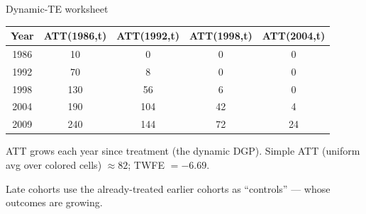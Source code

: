 \documentclass[aspectratio=169,11pt]{beamer}
\begin{document}
\begin{frame}{Dynamic-TE worksheet}
\begin{center}\footnotesize
\begin{tabular}{c|cccc}
\toprule
\textbf{Year} & \textbf{ATT(1986,t)} & \textbf{ATT(1992,t)} & \textbf{ATT(1998,t)} & \textbf{ATT(2004,t)} \\
\midrule
1986 & \cellcolor{forest!18}10 & 0 & 0 & 0 \\
1992 & \cellcolor{forest!18}70 & \cellcolor{ocean!22}8 & 0 & 0 \\
1998 & \cellcolor{forest!18}130 & \cellcolor{ocean!22}56 & \cellcolor{gold!28}6 & 0 \\
2004 & \cellcolor{forest!18}190 & \cellcolor{ocean!22}104 & \cellcolor{gold!28}42 & \cellcolor{harvardcrimson!18}4 \\
2009 & \cellcolor{forest!18}240 & \cellcolor{ocean!22}144 & \cellcolor{gold!28}72 & \cellcolor{harvardcrimson!18}24 \\
\bottomrule
\end{tabular}
\end{center}

\vspace{0.5em}
ATT grows each year since treatment (the dynamic DGP). \;Simple ATT (uniform avg over colored cells) $\approx 82$; \;TWFE $= -6.69$.

\vspace{0.4em}
 \;Late cohorts use the already-treated earlier cohorts as ``controls'' --- whose outcomes are growing.
\end{frame}

\end{document}
